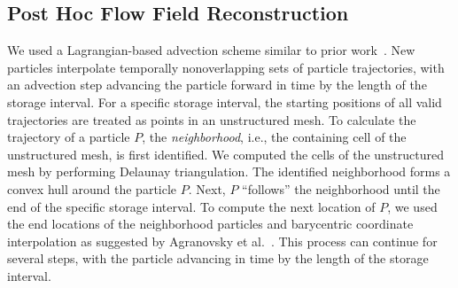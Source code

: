 \subsection{Post Hoc Flow Field Reconstruction}
\label{sec:posthoc}
We used a Lagrangian-based advection scheme similar to prior work~\cite{agranovsky2014improved, sane2018revisiting, sane2019interpolation}.
%
New particles interpolate temporally nonoverlapping sets of particle trajectories, with an advection step advancing the particle forward in time by the length of the storage interval.
%
%
%
%
For a specific storage interval, the starting positions of all valid trajectories are treated as points in an unstructured mesh.
%
To calculate the trajectory of a particle $P$, the \textit{neighborhood}, i.e., the containing cell of the unstructured mesh, is first identified.
%
We computed the cells of the unstructured mesh by performing Delaunay triangulation.
%
%
%
%
%
%
The identified neighborhood forms a convex hull around the particle $P$.
%
Next, $P$ ``follows'' the neighborhood until the end of the specific storage interval.
%
To compute the next location of $P$, we used the end locations of the neighborhood particles and barycentric coordinate interpolation as suggested by Agranovsky et al.~\cite{agranovsky2015subsampling}.
%
This process can continue for several steps, with the particle advancing in time by the length of the storage interval.
%

%
